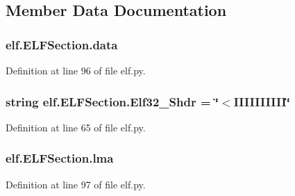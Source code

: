 \subsection{Member Data Documentation}
\subsubsection[{\texorpdfstring{data}{data}}]{\setlength{\rightskip}{0pt plus 5cm}elf.\+E\+L\+F\+Section.\+data}\hypertarget{clasself_1_1_e_l_f_section_ab25be052dd52c4599a066aa06fd8257b}{}\label{clasself_1_1_e_l_f_section_ab25be052dd52c4599a066aa06fd8257b}


Definition at line 96 of file elf.\+py.

\subsubsection[{\texorpdfstring{Elf32\+\_\+\+Shdr}{Elf32_Shdr}}]{\setlength{\rightskip}{0pt plus 5cm}string elf.\+E\+L\+F\+Section.\+Elf32\+\_\+\+Shdr = \char`\"{}$<$I\+I\+I\+I\+I\+I\+I\+I\+II\char`\"{}\hspace{0.3cm}{\ttfamily [static]}}\hypertarget{clasself_1_1_e_l_f_section_a3a35798c5d458c3aca833e43e6697cf2}{}\label{clasself_1_1_e_l_f_section_a3a35798c5d458c3aca833e43e6697cf2}


Definition at line 65 of file elf.\+py.

\subsubsection[{\texorpdfstring{lma}{lma}}]{\setlength{\rightskip}{0pt plus 5cm}elf.\+E\+L\+F\+Section.\+lma}\hypertarget{clasself_1_1_e_l_f_section_a24d14d591da93968d4d7c5cbf7d67370}{}\label{clasself_1_1_e_l_f_section_a24d14d591da93968d4d7c5cbf7d67370}


Definition at line 97 of file elf.\+py.

